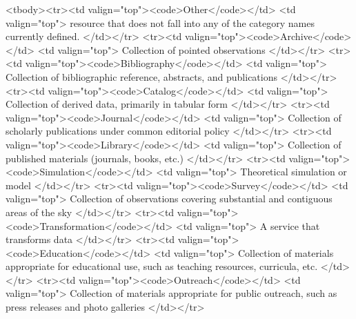 \documentclass[11pt,a4paper]{ivoa}
\begin{document}
                 <tbody><tr><td valign="top"><code>Other</code></td>
                     <td valign="top">
                       resource that does not fall into any of the category 
                       names currently defined.
                     </td></tr>
                 <tr><td valign="top"><code>Archive</code></td>
                     <td valign="top">
                       Collection of pointed observations
                     </td></tr>
                 <tr><td valign="top"><code>Bibliography</code></td>
                     <td valign="top">
                       Collection of bibliographic reference, abstracts, and 
                       publications
                     </td></tr>
                 <tr><td valign="top"><code>Catalog</code></td>
                     <td valign="top">
                       Collection of derived data, primarily in tabular form
                     </td></tr>
                 <tr><td valign="top"><code>Journal</code></td>
                     <td valign="top">
                       Collection of scholarly publications under common 
                       editorial policy
                     </td></tr>
                 <tr><td valign="top"><code>Library</code></td>
                     <td valign="top">
                       Collection of published materials (journals, books, etc.)
                     </td></tr>
                 <tr><td valign="top"><code>Simulation</code></td>
                     <td valign="top">
                       Theoretical simulation or model
                     </td></tr>
                 <tr><td valign="top"><code>Survey</code></td>
                     <td valign="top">
                       Collection of observations covering substantial and
                       contiguous areas of the sky
                     </td></tr>
                 <tr><td valign="top"><code>Transformation</code></td>
                     <td valign="top">
                       A service that transforms data
                     </td></tr>
                 <tr><td valign="top"><code>Education</code></td>
                     <td valign="top">
                       Collection of materials appropriate for educational use, 
                       such as teaching resources, curricula, etc.
                     </td></tr>
                 <tr><td valign="top"><code>Outreach</code></td>
                     <td valign="top">
                       Collection of materials appropriate for public outreach, 
                       such as press releases and photo galleries
                     </td></tr>
\end{document}
